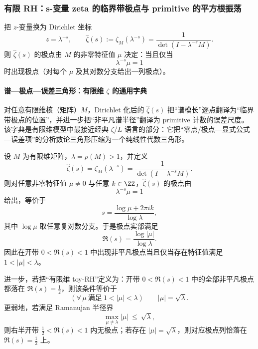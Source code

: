 \subsubsection{有限 RH：s-变量 zeta 的临界带极点与 primitive 的平方根振荡}\label{app:real-input-40-finite-rh}
把 $z$-变量换为 Dirichlet 坐标
\[
z=\lambda^{-s},\qquad \widehat{\zeta}(s):=\zeta_M(\lambda^{-s})=\frac{1}{\det(I-\lambda^{-s}M)}.
\]
则 $\widehat{\zeta}(s)$ 的极点由 $M$ 的非零特征值 $\mu$ 决定：当且仅当
\[
\lambda^{-s}\mu=1
\]
时出现极点（对每个 $\mu$ 及其对数分支给出一列极点）。

\paragraph{谱—极点—误差三角形：有限维 \texorpdfstring{$\zeta$}{zeta} 的通用字典}
对任意有限维核（矩阵）$M$，Dirichlet 化后的 $\widehat{\zeta}(s)$ 把“谱模长”逐点翻译为“临界带极点的位置”，并进一步把“非平凡谱半径”翻译为 primitive 计数的误差尺度。
该字典是有限维模型中最接近经典 \(\zeta\)/\(L\) 语言的部分：它把“零点/极点—显式公式—误差项”的分析数论三角形压缩为一个纯线性代数三角形。

\begin{proposition}\label{prop:finite-rh-triangle-dict}
设 $M$ 为有限维矩阵，$\lambda=\rho(M)>1$，并定义
\[
\widehat{\zeta}(s)=\zeta_M(\lambda^{-s})=\frac{1}{\det(I-\lambda^{-s}M)}.
\]
则对任意非零特征值 $\mu\neq 0$ 与任意 $k\in\ZZ$，$\widehat{\zeta}(s)$ 的极点由
\[
\lambda^{-s}\mu=1
\]
给出，等价于
\[
s=\frac{\log\mu+2\pi i k}{\log\lambda},
\]
其中 $\log\mu$ 取任意复对数分支。于是极点实部满足
\[
\Re(s)=\frac{\log|\mu|}{\log\lambda}.
\]
因此在开带 $0<\Re(s)<1$ 中出现非平凡极点当且仅当存在特征值满足 $1<|\mu|<\lambda$。

进一步，若把“有限维 toy-RH”定义为：开带 $0<\Re(s)<1$ 中的全部非平凡极点都落在 $\Re(s)=\tfrac12$，则该条件等价于
\[
(\forall\,\mu\ \text{满足}\ 1<|\mu|<\lambda)\qquad |\mu|=\sqrt{\lambda}.
\]
更弱地，若满足 Ramanujan 半径界
\[
\max_{\mu\neq\lambda}|\mu|\ \le\ \sqrt{\lambda},
\]
则右半开带 $\tfrac12<\Re(s)<1$ 内无极点；若存在 $|\mu|=\sqrt{\lambda}$，则对应极点列恰落在 $\Re(s)=\tfrac12$ 上。
\end{proposition}


